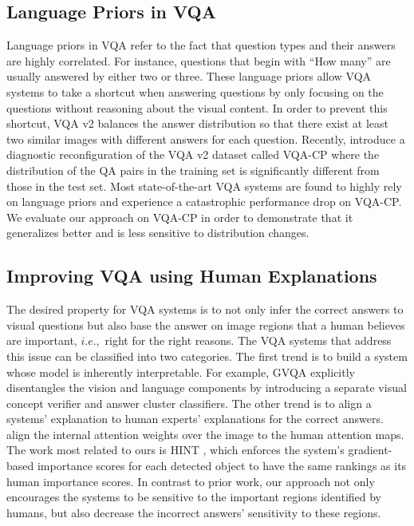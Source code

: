 \documentclass{article}
\begin{document}
\subsection{Language Priors in VQA}
Language priors \cite{vqa-cp,goyal2017making} in VQA refer to the fact that question types and their answers are highly correlated. For instance,  questions that begin with ``How many'' are usually answered by either two or three. These language priors allow VQA systems to take a shortcut when answering questions by only focusing on the questions without reasoning about the visual content. In order to prevent this shortcut, VQA v2 \cite{antol2015vqa} balances the answer distribution so that there exist at least two similar images with different answers for each question. Recently, \cite{vqa-cp} introduce a diagnostic reconfiguration of the VQA v2 dataset called VQA-CP where the distribution of the QA pairs in the training set is significantly different from those in the test set. Most state-of-the-art VQA systems are found to highly rely on language priors and experience a catastrophic performance drop on VQA-CP.  We evaluate our approach on VQA-CP in order to demonstrate that it generalizes better and is less sensitive to distribution changes.

\subsection{Improving VQA using Human Explanations}
The desired property for VQA systems is to not only infer the correct answers to visual questions but also base the answer on image regions that a human believes are important, $i.e., $ right for the right reasons. The VQA systems that address this issue can be classified into two categories. The first trend is to build a system whose model is inherently interpretable. For example, GVQA \cite{vqa-cp} explicitly disentangles the vision and language components by introducing a separate visual concept verifier and answer cluster classifiers. The other trend is to align a systems' explanation to human experts' explanations for the correct answers. \cite{zhang2019interpretable,qiao2018exploring} align the internal attention weights over the image to the human attention maps. The work most related to ours is HINT \cite{selvaraju2019taking}, which enforces the system's gradient-based importance scores for each detected object to have the same rankings as its human importance scores. In contrast to prior work, our approach not only encourages the systems to be sensitive to the important regions identified by humans, but also decrease the incorrect answers' sensitivity to these regions. 
\end{document}
